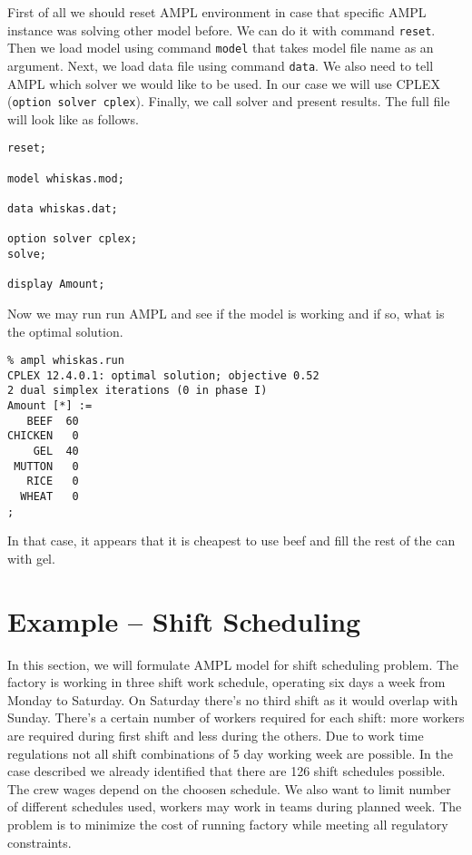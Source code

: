 First of all we should reset AMPL environment in case that specific AMPL instance was solving other model before. We can do it with command \texttt{reset}. Then we load model using command \texttt{model} that takes model file name as an argument. Next, we load data file using command \texttt{data}. We also need to tell AMPL which solver we would like to be used. In our case we will use CPLEX (\texttt{option solver cplex}). Finally, we call solver and present results. The full file will look like as follows.

\begin{lstlisting}
reset;

model whiskas.mod;

data whiskas.dat;

option solver cplex;
solve;

display Amount;
\end{lstlisting}

Now we may run run AMPL and see if the model is working and if so, what is the optimal solution.

\begin{lstlisting}
% ampl whiskas.run
CPLEX 12.4.0.1: optimal solution; objective 0.52
2 dual simplex iterations (0 in phase I)
Amount [*] :=
   BEEF  60
CHICKEN   0
    GEL  40
 MUTTON   0
   RICE   0
  WHEAT   0
;
\end{lstlisting}

In that case, it appears that it is cheapest to use beef and fill the rest of the can with gel.

\section{Example -- Shift Scheduling}
\label{sec:ampl:sched}
In this section, we will formulate AMPL model for shift scheduling problem\cite{Fourer2002}. The factory is working in three shift work schedule, operating six days a week from Monday to Saturday. On Saturday there's no third shift as it would overlap with Sunday. There's a certain number of workers required for each shift: more workers are required during first shift and less during the others. Due to work time regulations not all shift combinations of 5 day working week are possible. In the case described we already identified  that there are 126 shift schedules possible. The crew wages depend on the choosen schedule. We also want to limit number of different schedules used, workers may work in teams during planned week. The problem is to minimize the cost of running factory while meeting all regulatory constraints.

